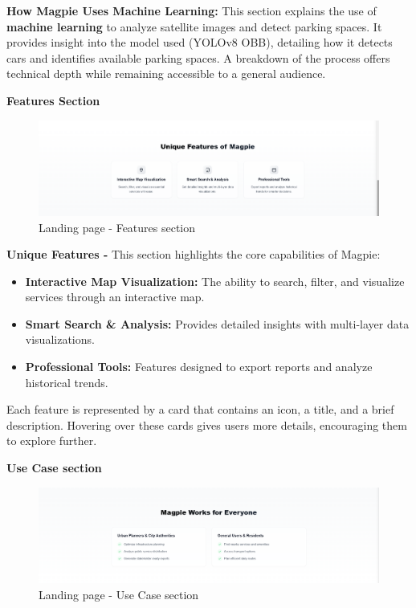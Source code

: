\textbf{How Magpie Uses Machine Learning:} This section explains the use of
\textbf{machine learning} to analyze satellite images and detect parking spaces.
It provides insight into the model used (YOLOv8 OBB), detailing how it detects
cars and identifies available parking spaces. A breakdown of the process offers
technical depth while remaining accessible to a general audience.

\newpage{}

\textbf{Features Section}

\begin{figure}[htbp]
    \centering{}
    \includegraphics[width=1\textwidth]{images/site/landing/landing_3_features.png}
    \caption{Landing page {-} Features section}
\end{figure}

\textbf{Unique Features {-} } This section highlights the core capabilities of
Magpie:

\begin{itemize}
    \item{} \textbf{Interactive Map Visualization:} The ability to search,
    filter, and visualize services through an interactive map.
    \item{} \textbf{Smart Search \& Analysis:} Provides detailed insights with
    multi{-}layer data visualizations.
    \item{} \textbf{Professional Tools:} Features designed to export reports and
    analyze historical trends.
\end{itemize}

Each feature is represented by a card that contains an icon, a title, and a
brief description. Hovering over these cards gives users more details,
encouraging them to explore further.


\textbf{Use Case section}

\begin{figure}[htbp]
    \centering{}
    \includegraphics[width=1\textwidth]{images/site/landing/landing_4_usecases.png}
    \caption{Landing page {-} Use Case section}
\end{figure}

